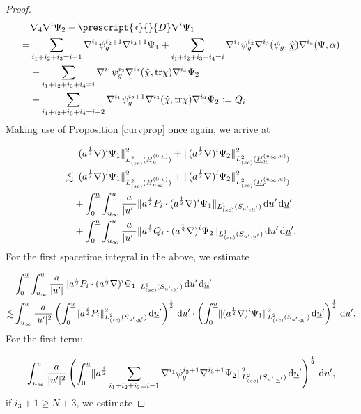 \documentclass{amsart}
\newcommand{\aln}{(\al \nabla)^i}
\newcommand{\ali}{a^{\frac{i}{2}}}
\newcommand{\dubarprime}{\hspace{.5mm} \text{d} \ubar^{\prime}}
\newcommand{\intu}{\int_{u_{\infty}}^u}
\newcommand{\intubar}{\int_0^{\ubar}}
\newcommand{\chihat}{\hat{\chi}}
\newcommand{\upr}{\lvert u^\prime \rvert}
\newcommand{\al}{a^{\frac{1}{2}}}
\newcommand{\chibarhat}{\underline{\hat{\chi}}}
\newcommand{\ubar}{\underline{u}}
\newcommand{\sumitm}{\sum_{i_1+i_2+i_3=i-1}}
\newcommand{\sumif}{\sum_{i_1+i_2+i_3+i_4=i}}
\newcommand{\sumifim}{\sum_{i_1+i_2+i_3+i_4=i-2}}
\newcommand{\nablap}{\nabla^{i_1}\psi_g^{i_2}}
\newcommand{\nablapp}{\nabla^{i_1}\psi_g^{i_2+1}}
\newcommand{\scaleoneSuprimeubarprime}[1]{\lVert{#1} \rVert_{L^1_{(sc)}(S_{u^\prime,\ubar^\prime})}}
\newcommand{\scaletwoSuprimeubarprime}[1]{\lVert{#1} \rVert_{L^2_{(sc)}(S_{u^\prime,\ubar^\prime})}}
\newcommand{\scaletwoHzero}[1]{\lVert{#1} \rVert_{L^2_{(sc)}(H_{u_{\infty}}^{(0,\underline{u})})}}
\newcommand{\scaletwoHu}[1]{\lVert{#1} \rVert_{L^2_{(sc)}(H_u^{(0,\underline{u})})}}
\newcommand{\scaletwoHbarzero}[1]{\lVert{#1} \rVert_{L^2_{(sc)}(\underline{H}_{0}^{(u_{\infty},u)})}}
\newcommand{\scaletwoHbaru}[1]{\lVert{#1} \rVert_{L^2_{(sc)}(\underline{H}_{\underline{u}}^{(u_{\infty},u)})}}
\newcommand{\duprime}{\hspace{.5mm} \text{d}u^{\prime}}
\newcommand{\nablat}{\nabla^{i_3}}
\newcommand{\nablaf}{\nabla^{i_4}}
\newcommand{\Hodge}[1]{\prescript{*}{}{#1}}
\newcommand{\tr}{\mbox{tr}}
\begin{document}
{\begin{proof}
\begin{equation}
    \begin{split}
        &\nabla_4 \nabla^i \Psi_2 -\Hodge{ D} \nabla^i \Psi_1 \\= &\sumitm \nablapp \nabla^{i_3+1}\Psi_1 + \sumif \nablap \nablat(\psi_g,\chibarhat) \nablaf(\Psi, \alpha)  \\ &+\sumif \nablap \nablat(\chihat,\tr\chi) \nablaf \Psi_2 \\ &+ \sumifim \nablapp \nablat (\chihat,\tr\chi) \nablaf \Psi_2 := Q_i.
    \end{split}
\end{equation}Making use of Proposition \ref{curvprop} once again, we arrive at 

\begin{equation}\label{mainpsu}
    \begin{split}
        &\scaletwoHu{\aln \Psi_1}^2 + \scaletwoHbaru{\aln \Psi_2}^2 \\ \lesssim & \scaletwoHzero{\aln \Psi_1}^2 + \scaletwoHbarzero{\aln \Psi_2}^2 \\&+  \intubar \intu  \frac{a}{\upr} \scaleoneSuprimeubarprime{\ali P_i \cdot \aln \Psi_1 }  \duprime \dubarprime
        \\ &+\intubar \intu  \frac{a}{\upr} \scaleoneSuprimeubarprime{\ali Q_i \cdot \aln \Psi_2 }  \duprime \dubarprime .
        \end{split}
\end{equation}For the first spacetime integral in the above, we estimate


\begin{equation}\label{comb1}
    \begin{split}
       & \intubar \intu  \frac{a}{\upr} \scaleoneSuprimeubarprime{\ali P_i \cdot \aln \Psi_1 }  \duprime \dubarprime \\\lesssim& \intu \frac{a}{\upr^2} \left( \intubar \scaletwoSuprimeubarprime{\ali P_i}^2 \dubarprime \right)^{\frac{1}{2}} \duprime \cdot \left( \intubar \scaletwoSuprimeubarprime{\aln \Psi_1}^2 \dubarprime \right)^{\frac{1}{2}} \duprime.
    \end{split}
\end{equation}For the first term:


\begin{equation}
    \begin{split}
        \intu \frac{a}{\upr^2} \left( \intubar \scaletwoSuprimeubarprime{\ali \sumitm \nablapp \nabla^{i_3+1}\Psi_2 }^2 \dubarprime \right)^{\frac{1}{2}} \duprime,
    \end{split}
\end{equation}if $i_3+1 \geq N+3$, we estimate 



\end{proof}}
\end{document}
